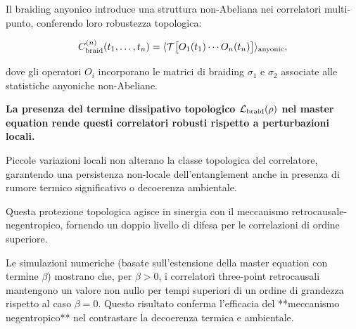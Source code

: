 \documentclass[11pt,a4paper]{article}
\theoremstyle{plain}
\theoremstyle{definition}
\begin{document}
Il braiding anyonico introduce una struttura non-Abeliana nei correlatori multi-punto, conferendo loro robustezza topologica:


\vspace{0.3cm}

\begin{tcolorbox}[
  colback=violet!3!white, 
  colframe=violet!70!black, 
  title=Correlatore anyonico time-ordered protetto dal braiding, 
  fonttitle=\bfseries,
  breakable,
  enhanced,
  width=\textwidth,
  boxrule=0.8pt,
  arc=5pt
]
\begin{equation}
C_{\rm braid}^{(n)}(t_1,\dots,t_n) = \langle \mathcal{T} \bigl[ O_1(t_1) \cdots O_n(t_n) \bigr] \rangle_{\rm anyonic},
\label{eq:braid_correlator}
\end{equation}
\end{tcolorbox}


\vspace{0.5cm}

dove gli operatori $O_i$ incorporano le matrici di braiding $\sigma_1$ e $\sigma_2$ associate alle statistiche anyoniche non-Abeliane. 



\vspace{0.6cm}

\textbf{La presenza del termine dissipativo topologico $\mathcal{L}_{\rm braid}(\rho)$ nel master equation rende questi correlatori robusti rispetto a perturbazioni locali.} 


\vspace{0.5cm}


Piccole variazioni locali non alterano la classe topologica del correlatore, garantendo una persistenza non-locale dell’entanglement anche in presenza di rumore termico significativo o decoerenza ambientale. 



\vspace{0.4cm}



Questa protezione topologica agisce in sinergia con il meccanismo retrocausale-negentropico, fornendo un doppio livello di difesa per le correlazioni di ordine superiore.


\clearpage

Le simulazioni numeriche (basate sull’estensione della master equation con termine $\beta$) mostrano che, per $\beta > 0$, i correlatori three-point retrocausali mantengono un valore non nullo per tempi superiori di un ordine di grandezza rispetto al caso $\beta=0$. Questo risultato conferma l’efficacia del **meccanismo negentropico** nel contrastare la decoerenza termica e ambientale.
\end{document}

